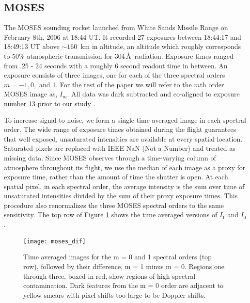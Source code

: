 	\subsection{MOSES}\label{sec:MOSES_data}
	
		The MOSES sounding rocket launched from White Sands Missile Range on February 8th, 2006 at 18:44 UT. 
		It recorded 27 exposures between 18:44:17 and 18:49:13 UT above $\sim 160$\, km in altitude, an altitude which roughly corresponds to 50\% atmospheric transmission for 304\,\AA\ radiation.  
		Exposure times ranged from .25 - 24 seconds with a roughly 6 second readout time in between.  
		An exposure consists of three images, one for each of the three spectral orders $m = -1, 0, \text{\ and\ } 1$.
		For the rest of the paper we will refer to the $m$th order MOSES image as, $I_m$.  
		All data was dark subtracted and co-aligned to exposure number 13 prior to our study \citep{Fox2010}. 
		
    	To increase signal to noise, we form a single time averaged image in each spectral order. The wide range of exposure times obtained during the flight guarantees that well exposed, unsaturated intensities are available at every spatial location.
    	Saturated pixels are replaced with IEEE NaN (Not a Number) and treated as missing data.
		Since MOSES observes through a time-varying column of atmosphere throughout its flight, we use the median of each image as a proxy for exposure time, rather than the amount of time the shutter is open.
		At each spatial pixel, in each spectral order, the average intensity is the sum over time of unsaturated intensities divided by the sum of their proxy exposure times. This procedure also renormalizes the three MOSES spectral orders to the same sensitivity.
		The top row of Figure \ref{fig:moses_super} shows the time averaged versions of $I_1$ and $I_0$. 
		
		
		\begin{figure}
			\centering
			\texttt{[image: moses\_dif]}
			\caption{Time averaged images for the m = 0 and 1 spectral orders (top row), followed by their difference, m = 1 minus m = 0.  Regions one through three, boxed in red, show regions of high spectral contamination. Dark features from the m = 0 order are adjacent to yellow smears with pixel shifts too large to be Doppler shifts.}
			\label{fig:moses_super}
		\end{figure}
	
